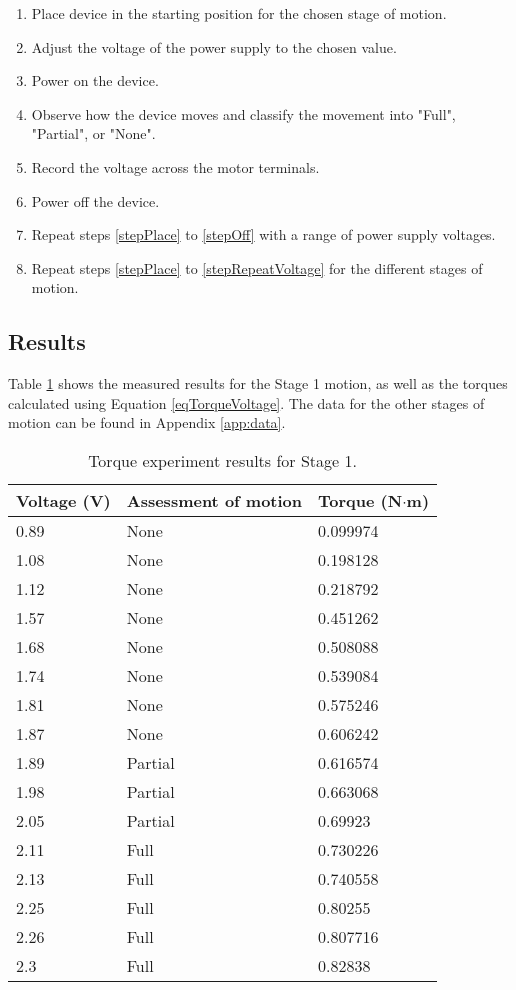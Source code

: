 \begin{enumerate}
	\item Place device in the starting position for the chosen stage of motion. \label{stepPlace}
	\item Adjust the voltage of the power supply to the chosen value.
	\item Power on the device.
	\item Observe how the device moves and classify the movement into "Full", "Partial", or "None". 
	\item Record the voltage across the motor terminals. 
	\item Power off the device.\label{stepOff}
	\item Repeat steps \ref{stepPlace} to \ref{stepOff} with a range of power supply voltages.\label{stepRepeatVoltage}
	\item Repeat steps \ref{stepPlace} to \ref{stepRepeatVoltage} for the different stages of motion.
\end{enumerate}

\subsection{Results}

Table \ref{tab:Stage1Torque} shows the measured results for the Stage 1 motion, as well as the torques calculated using Equation \ref{eqTorqueVoltage}. The data for the other stages of motion can be found in Appendix \ref{app:data}.

\begin{table}[!h]
	\centering
	\caption{Torque experiment results for Stage 1.}
	\label{tab:Stage1Torque}
	\begin{tabular}{|l|l|l|}
		\hline
		Voltage (V) & Assessment of motion & Torque (N$\cdot$m) \\ \hline
		0.89 & None & 0.099974 \\ \hline
		1.08 & None & 0.198128 \\ \hline
		1.12 & None & 0.218792 \\ \hline
		1.57 & None & 0.451262 \\ \hline
		1.68 & None & 0.508088 \\ \hline
		1.74 & None & 0.539084 \\ \hline
		1.81 & None & 0.575246 \\ \hline
		1.87 & None & 0.606242 \\ \hline
		1.89 & Partial & 0.616574 \\ \hline
		1.98 & Partial & 0.663068 \\ \hline
		2.05 & Partial & 0.69923 \\ \hline
		2.11 & Full & 0.730226 \\ \hline
		2.13 & Full & 0.740558 \\ \hline
		2.25 & Full & 0.80255 \\ \hline
		2.26 & Full & 0.807716 \\ \hline
		2.3 & Full & 0.82838 \\ \hline
	\end{tabular}
\end{table}

